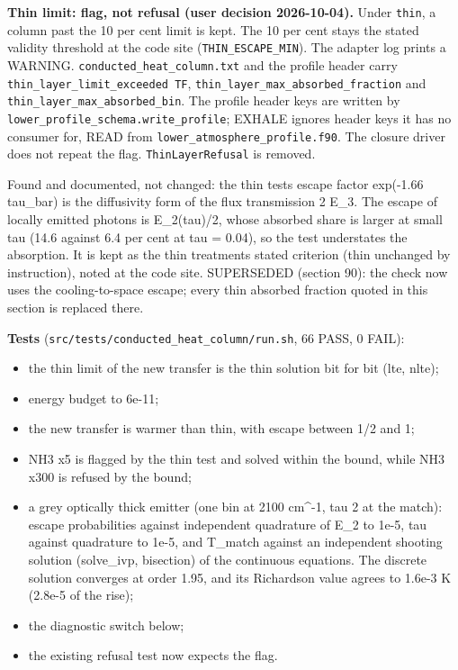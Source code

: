 \documentclass[english,a4paper]{my_memo}
\providecommand{\tightlist}{\setlength{\itemsep}{0pt}\setlength{\parskip}{0pt}}
\begin{document}
\textbf{Thin limit: flag, not refusal (user decision 2026-10-04).} Under \texttt{thin},
a column past the 10 per cent limit is kept. The 10 per cent stays the
stated validity threshold at the code site (\texttt{THIN\_ESCAPE\_MIN}). The adapter
log prints a WARNING. \texttt{conducted\_heat\_column.txt} and the profile header
carry \texttt{thin\_layer\_limit\_exceeded\ T\textbar{}F}, \texttt{thin\_layer\_max\_absorbed\_fraction}
and \texttt{thin\_layer\_max\_absorbed\_bin}. The profile header keys are written by
\texttt{lower\_profile\_schema.write\_profile}; EXHALE ignores header keys it has no
consumer for, READ from \texttt{lower\_atmosphere\_profile.f90}. The closure driver
does not repeat the flag. \texttt{ThinLayerRefusal} is removed.

Found and documented, not changed: the thin test\textquotesingle s escape factor
exp(-1.66 tau\_bar) is the diffusivity form of the flux transmission
2 E\_3. The escape of locally emitted photons is E\_2(tau)/2, whose absorbed
share is larger at small tau (14.6 against 6.4 per cent at tau = 0.04), so
the test understates the absorption. It is kept as the thin treatment\textquotesingle s
stated criterion (thin unchanged by instruction), noted at the code site.
SUPERSEDED (section 90): the check now uses the cooling-to-space escape;
every thin absorbed fraction quoted in this section is replaced there.

\textbf{Tests} (\texttt{src/tests/conducted\_heat\_column/run.sh}, 66 PASS, 0 FAIL):

\begin{itemize}
\tightlist
\item
  the thin limit of the new transfer is the thin solution bit for bit (lte,
  nlte);
\item
  energy budget to 6e-11;
\item
  the new transfer is warmer than thin, with escape between 1/2 and 1;
\item
  NH3 x5 is flagged by the thin test and solved within the bound, while
  NH3 x300 is refused by the bound;
\item
  a grey optically thick emitter (one bin at 2100 cm\^{}-1, tau 2 at the
  match): escape probabilities against independent quadrature of E\_2 to
  1e-5, tau against quadrature to 1e-5, and T\_match against an independent
  shooting solution (solve\_ivp, bisection) of the continuous equations.
  The discrete solution converges at order 1.95, and its Richardson value
  agrees to 1.6e-3 K (2.8e-5 of the rise);
\item
  the diagnostic switch below;
\item
  the existing refusal test now expects the flag.
\end{itemize}
\end{document}
